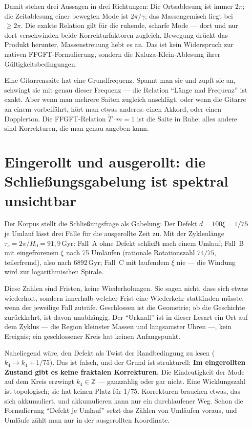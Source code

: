 Damit stehen drei Aussagen in drei Richtungen: Die Ortsablesung ist
immer $2\pi$; die Zeitablesung einer bewegten Mode ist $2\pi/\gamma$;
das Massengemisch liegt bei $\ge2\pi$. Die exakte Relation gilt für die
ruhende, scharfe Mode --- dort und nur dort verschwinden beide
Korrekturfaktoren zugleich. Bewegung drückt das Produkt herunter,
Massenstreuung hebt es an. Das ist kein Widerspruch zur nativen
FFGFT-Formulierung, sondern die Kaluza-Klein-Ablesung ihrer
Gültigkeitsbedingungen.

\begin{laierspur}
Eine Gitarrensaite hat eine Grundfrequenz. Spannt man sie und zupft
sie an, schwingt sie mit genau dieser Frequenz --- die Relation
\enquote{Länge mal Frequenz} ist exakt. Aber wenn man mehrere Saiten
zugleich anschlägt, oder wenn die Gitarre an einem vorbeifährt, hört
man etwas anderes: einen Akkord, oder einen Dopplerton. Die FFGFT-Relation
$\tilde T\cdot m = 1$ ist die Saite in Ruhe; alles andere sind
Korrekturen, die man genau angeben kann.
\end{laierspur}

\section{Eingerollt und ausgerollt: die Schließungsgabelung ist spektral unsichtbar}

Der Korpus stellt die Schließungsfrage als Gabelung: Der Defekt
$d = 100\xi = 1/75$ je Umlauf lässt drei Fälle für die ausgerollte Zeit
zu. Mit der Zyklenlänge $\tau_c = 2\pi/H_0 = 91{,}9$\,Gyr: Fall~A ohne
Defekt schließt nach einem Umlauf; Fall~B mit eingefrorenem $\xi$ nach
75 Umläufen (rationale Rotationszahl $74/75$, teilerfremd), also nach
$6892$\,Gyr; Fall~C mit laufendem $\xi$ nie --- die Windung wird zur
logarithmischen Spirale.

Diese Zahlen sind Fristen, keine Wiederholungen. Sie sagen nicht, dass
sich etwas wiederholt, sondern innerhalb welcher Frist eine Wiederkehr
stattfinden müsste, wenn der jeweilige Fall zuträfe. Geschlossen ist die
Geometrie; ob die Geschichte zurückkehrt, ist davon unabhängig. Der
\enquote{Urknall} ist in dieser Lesart ein Ort auf dem Zyklus --- die
Region kleinster Massen und langsamster Uhren ---, kein Ereignis; ein
geschlossener Kreis hat keinen Anfangspunkt.

Naheliegend wäre, den Defekt als Twist der Randbedingung zu lesen
($k_4\to k_4+1/75$). Das ist falsch, und der Grund ist strukturell:
\textbf{Im eingerollten Zustand gibt es keine fraktalen Korrekturen.}
Die Eindeutigkeit der Mode auf dem Kreis erzwingt $k_4\in\mathbb{Z}$
--- ganzzahlig oder gar nicht. Eine Wicklungszahl ist topologisch; sie
hat keinen Platz für $1/75$. Korrekturen brauchen etwas, das sich
akkumuliert, und akkumulieren kann nur ein durchlaufener Weg. Schon die
Formulierung \enquote{Defekt je Umlauf} setzt das Zählen von Umläufen
voraus, und Umläufe zählt man nur in der ausgerollten Koordinate.

